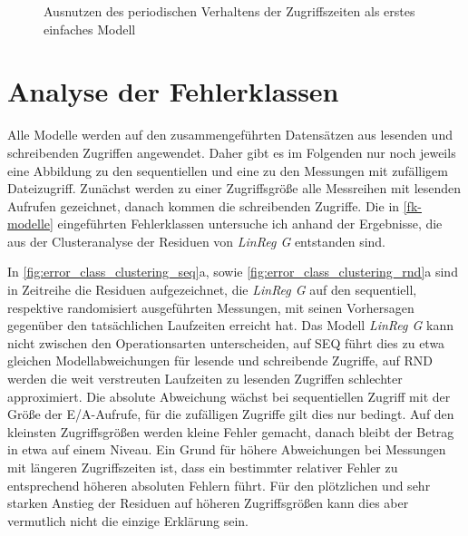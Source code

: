 \documentclass[
	12pt,
	a4paper,
	BCOR10mm,
	DIV14,
	listof=totoc,
	bibliography=totoc,
	headsepline
]{scrreprt}
\begin{document}
\begin{figure}
	\begin{center}
		\caption{Ausnutzen des periodischen Verhaltens der Zugriffszeiten als erstes einfaches Modell}
		\label{fig:periodicity100001}
	\end{center}
\end{figure} 
\clearpage

\section{Analyse der Fehlerklassen}
\label{eval:fk_analyse}
Alle Modelle werden auf den zusammengeführten Datensätzen aus lesenden und schreibenden Zugriffen angewendet. Daher gibt es im Folgenden nur noch jeweils eine Abbildung zu den sequentiellen und eine zu den Messungen mit zufälligem Dateizugriff.
Zunächst werden zu einer Zugriffsgröße alle Messreihen mit lesenden Aufrufen gezeichnet, danach kommen die schreibenden Zugriffe. 
Die in \ref{fk-modelle} eingeführten Fehlerklassen untersuche ich anhand der Ergebnisse, die aus der Clusteranalyse der Residuen von \textit{LinReg G} entstanden sind.\medskip

In \ref{fig:error_class_clustering_seq}a, sowie \ref{fig:error_class_clustering_rnd}a sind in Zeitreihe die Residuen aufgezeichnet, die \textit{LinReg G} auf den sequentiell, respektive randomisiert ausgeführten Messungen, mit seinen Vorhersagen gegenüber den tatsächlichen Laufzeiten erreicht hat.
Das Modell \textit{LinReg G} kann nicht zwischen den Operationsarten unterscheiden, auf SEQ führt dies zu etwa gleichen Modellabweichungen für lesende und schreibende Zugriffe, auf RND werden die weit verstreuten Laufzeiten zu lesenden Zugriffen schlechter approximiert.
Die absolute Abweichung wächst bei sequentiellen Zugriff mit der Größe der E/A-Aufrufe, für die zufälligen Zugriffe gilt dies nur bedingt. Auf den kleinsten Zugriffsgrößen werden kleine Fehler gemacht, danach bleibt der Betrag in etwa auf einem Niveau.
Ein Grund für höhere Abweichungen bei Messungen mit längeren Zugriffszeiten ist, dass ein bestimmter relativer Fehler zu entsprechend höheren absoluten Fehlern führt.
Für den plötzlichen und sehr starken Anstieg der Residuen auf höheren Zugriffsgrößen kann dies aber vermutlich nicht die einzige Erklärung sein.
\end{document}
